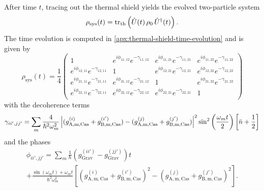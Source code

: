 After time $t$, tracing out the thermal shield yields the evolved two-particle system
\begin{equation}
  \rho_\mathrm{sys}(t) = \tr_\mathrm{th}\left(\hat{U}(t) \, \rho_0 \, \hat{U}^\dagger(t)\right) .
\end{equation}
The time evolution is computed in \cref{apx:thermal-shield-time-evolution} and is given by
\begin{equation}
  \rho_\mathrm{sys}(t) = \frac{1}{4} \begin{pmatrix}
    1 & e^{i\phi_{11,12}} e^{-\gamma_{11,12}} & e^{i\phi_{11,21}} e^{-\gamma_{11,21}} & e^{i\phi_{11,22}} e^{-\gamma_{11,22}} \\
    e^{i\phi_{12,11}} e^{-\gamma_{12,11}} & 1 & e^{i\phi_{12,21}} e^{-\gamma_{12,21}} & e^{i\phi_{12,22}} e^{-\gamma_{12,22}} \\
    e^{i\phi_{21,11}} e^{-\gamma_{21,11}} & e^{i\phi_{21,12}} e^{-\gamma_{21,12}} & 1 & e^{i\phi_{21,22}} e^{-\gamma_{21,22}} \\
    e^{i\phi_{22,11}} e^{-\gamma_{22,11}} & e^{i\phi_{22,12}} e^{-\gamma_{22,12}} & e^{i\phi_{22,21}} e^{-\gamma_{22,21}} & 1 \\
  \end{pmatrix}
\end{equation}
with the decoherence terms
\begin{equation}\label{eq:5:analytical-decoherence}
  \gamma_{ii',jj'} = \sum_m \frac{4}{\hbar^2\omega_m^2} \left\lvert(g^{(i)}_\mathrm{A,m,Cas} + g^{(i')}_\mathrm{B,m,Cas}) - (g^{(j)}_\mathrm{A,m,Cas} + g^{(j')}_\mathrm{B,m,Cas})\right\rvert^2 \sin^2\left(\frac{\omega_m t}{2}\right) \left[\bar{n} + \frac{1}{2}\right]
\end{equation}
and the phases
\begin{multline}\label{eq:5:analytical-phases}
  \phi_{ii',jj'} = \sum_m \frac{1}{\hbar} \left( g^{(ii')}_\mathrm{Grav} - g^{(jj')}_\mathrm{Grav} \right) t \\
  + \frac{\sin(\omega_m t)+\omega_m t}{\hbar^2\omega_m^2}\left[(g^{(i)}_\mathrm{A,m,Cas} + g^{(i')}_\mathrm{B,m,Cas})^2 - (g^{(j)}_\mathrm{A,m,Cas} + g^{(j')}_\mathrm{B,m,Cas})^2\right] .
\end{multline}
